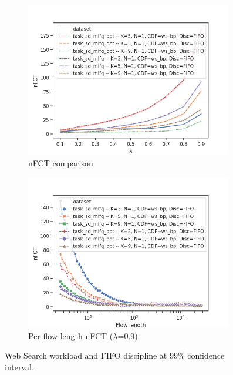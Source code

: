 \begin{figure}
	\centering
	\begin{subfigure}{.5\textwidth}
		\centering
		\includegraphics[width=0.99\textwidth]{Chapter3/Figures/lb_opt_vs_nopt_comparison}
		\caption{nFCT comparison}
	\end{subfigure}%
	\hfill
	\begin{subfigure}{.5\textwidth}
		\centering
		\includegraphics[width=0.99\textwidth]{Chapter3/Figures/lb_opt_vs_nopt_detailed}
		\caption{Per-flow length nFCT ($\lambda$=0.9)}
		\label{fig:lb-var-K-fifo-detailed}
	\end{subfigure}
	\caption{Web Search workload and FIFO discipline at 99\% confidence interval.}
	\label{fig:lb-var-K-fifo}
\end{figure}
